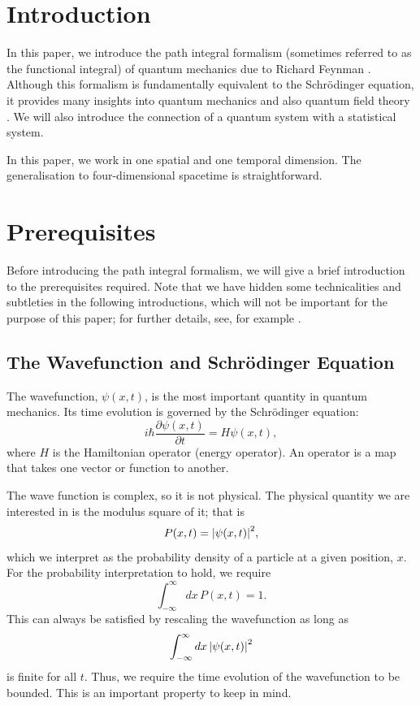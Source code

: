 \documentclass[12pt,a4paper]{article}
\begin{document}

\section{Introduction}
In this paper, we introduce the path integral formalism (sometimes referred to as the functional integral) of quantum mechanics due to Richard Feynman \cite{Feynman1948}. Although this formalism is fundamentally equivalent to the Schrödinger equation, it provides many insights into quantum mechanics and also quantum field theory \cite{TongQM, Peskin}. We will also introduce the connection of a quantum system with a statistical system. 

In this paper, we work in one spatial and one temporal dimension.
The generalisation to four-dimensional spacetime is straightforward.

\section{Prerequisites}
Before introducing the path integral formalism, we will give a brief introduction to the prerequisites required. Note that we have hidden some technicalities and subtleties in the following introductions, which will not be important for the purpose of this paper; for further details, see, for example \cite{Kibble, Sakurai, TongQM}.

\subsection{The Wavefunction and Schrödinger Equation}
\label{SCH}
The wavefunction, $\psi(x,t)$, is the most important quantity in quantum mechanics. Its time evolution is governed by the Schrödinger equation:
\begin{equation}
    i\hbar\frac{\partial\psi(x,t)}{\partial t} = H\psi(x,t),
    \label{sch}
\end{equation}
where $H$ is the Hamiltonian operator (energy operator). An operator is a map that takes one vector or function to another.

The wave function is complex, so it is not physical. The physical quantity we are interested in is the modulus square of it; that is
\begin{equation}
    P(x,t) = \abs{\psi(x,t)}^2,
\end{equation}
which we interpret as the probability density of a particle at a given position, $x$. For the probability interpretation to hold, we require
\begin{equation}
    \int^\infty_{-\infty}dx\, P(x,t) = 1.
\end{equation}
This can always be satisfied by rescaling the wavefunction as long as
\begin{equation}
    \int^\infty_{-\infty}dx\,\abs{\psi(x,t)}^2
\end{equation}
is finite for all $t$. Thus, we require the time evolution of the wavefunction to be bounded. This is an important property to keep in mind.
\end{document}
